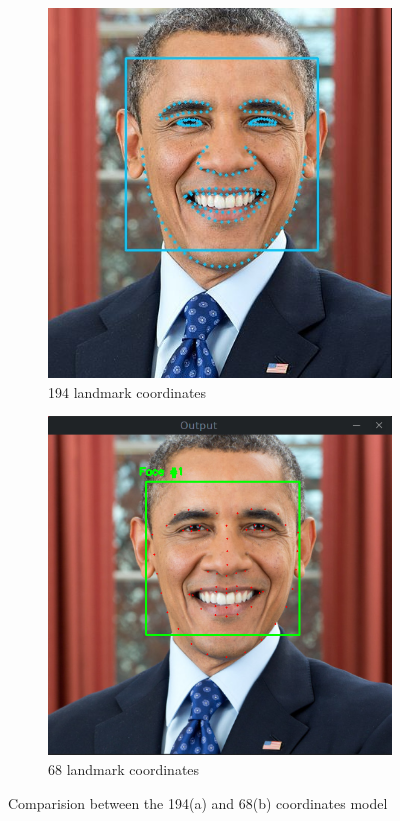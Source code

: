 \documentclass[12pt,a4paper]{article}
\begin{document}
    \begin{figure}[!ht]
    \centering
    \begin{subfigure}{.4\textwidth}
        \centering
        \includegraphics[width=.7\linewidth]{Obama_194.png}
        \caption{194 landmark coordinates}
        \label{fig:sub1}
    \end{subfigure}
    \begin{subfigure}{.4\textwidth}
        \centering
        \includegraphics[width=.7\linewidth]{Obama_8.png}
        \caption{68 landmark coordinates}
        \label{fig:sub2}
    \end{subfigure}
    \caption{Comparision between the 194(a) and 68(b) coordinates model}
    \label{fig:test}
    \end{figure}
    
\end{document}
